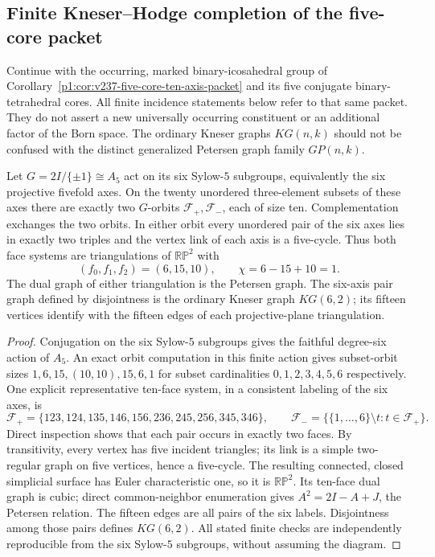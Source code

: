\documentclass[11pt]{article}
\begin{document}
\subsection{Finite Kneser--Hodge completion of the five-core packet}
\label{p1:sec:kneser-hodge-closure}

Continue with the occurring, marked binary-icosahedral group of
Corollary~\ref{p1:cor:v237-five-core-ten-axis-packet} and its five conjugate
binary-tetrahedral cores. All finite incidence statements below refer to that
same packet. They do not assert a new universally occurring constituent or an
additional factor of the Born space. The ordinary Kneser graphs $KG(n,k)$
should not be confused with the distinct generalized Petersen graph family
$GP(n,k)$.

\begin{theorem}
\label{p1:thm:kneser-six-axis-triangle-systems}
\leavevmode\par
Let $G=2I/\{\pm1\}\cong A_5$ act on its six Sylow-$5$ subgroups,
equivalently the six projective fivefold axes. On the twenty unordered
three-element subsets of these axes there are exactly two $G$-orbits
$\mathcal F_+,\mathcal F_-$, each of size ten. Complementation exchanges
the two orbits. In either orbit every unordered pair of the six axes lies
in exactly two triples and the vertex link of each axis is a five-cycle.
Thus both face systems are triangulations of $\mathbb{RP}^2$ with
\[
 (f_0,f_1,f_2)=(6,15,10),\qquad \chi=6-15+10=1.
\]
The dual graph of either triangulation is the Petersen graph.
The six-axis pair graph defined by disjointness is the ordinary Kneser
graph $KG(6,2)$; its fifteen vertices identify with the fifteen edges of
each projective-plane triangulation.
\end{theorem}
\begin{proof}
Conjugation on the six Sylow-$5$ subgroups gives the faithful degree-six
action of $A_5$. An exact orbit computation in this finite action gives
subset-orbit sizes $1,6,15,(10,10),15,6,1$ for subset cardinalities
$0,1,2,3,4,5,6$ respectively. One explicit representative ten-face
system, in a consistent labeling of the six axes, is
\[
\mathcal F_+=\{123,124,135,146,156,236,245,256,345,346\},
\qquad \mathcal F_-=\{\{1,\dots,6\}\setminus t:t\in\mathcal F_+\}.
\]
Direct inspection shows that each pair occurs in exactly two faces.
By transitivity, every vertex has five incident triangles; its link
is a simple two-regular graph on five vertices, hence a five-cycle.
The resulting connected, closed simplicial surface has Euler
characteristic one, so it is $\mathbb{RP}^2$. Its ten-face dual graph
is cubic; direct common-neighbor enumeration gives
$A^2=2I-A+J$, the Petersen relation. The fifteen edges are all
pairs of the six labels. Disjointness among those pairs defines
$KG(6,2)$. All stated finite checks are independently reproducible
from the six Sylow-$5$ subgroups, without assuming the diagram.
\end{proof}
\end{document}
